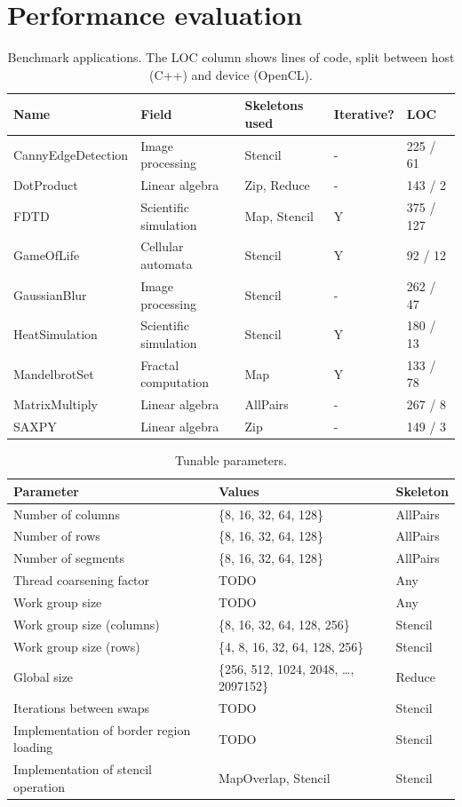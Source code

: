 \newpage
\section*{Performance evaluation}

\begin{table}
\footnotesize
\centering
\begin{tabular}{| l | l | l | l | l |}
\hline
\textbf{Name} & \textbf{Field} & \textbf{Skeletons used} & \textbf{Iterative?} & \textbf{LOC}\\
\hline
CannyEdgeDetection & Image processing & Stencil & - & 225 / 61\\
DotProduct & Linear algebra & Zip, Reduce & - & 143 / 2\\
FDTD & Scientific simulation & Map, Stencil & Y & 375 / 127\\
GameOfLife & Cellular automata & Stencil & Y & 92 / 12\\
GaussianBlur & Image processing & Stencil & - & 262 / 47\\
HeatSimulation & Scientific simulation & Stencil & Y & 180 / 13\\
MandelbrotSet & Fractal computation & Map & Y & 133 / 78\\
MatrixMultiply & Linear algebra & AllPairs & - & 267 / 8\\
SAXPY & Linear algebra & Zip & - & 149 / 3\\
\hline
\end{tabular}
\caption{Benchmark applications. The LOC column shows lines of code, split between host (C++) and device (OpenCL).}
\end{table}


\begin{table}
\footnotesize
\centering
\begin{tabular}{| l | l | l |}
\hline
\textbf{Parameter} & \textbf{Values} & \textbf{Skeleton}\\
\hline
Number of columns & \{8, 16, 32, 64, 128\} & AllPairs\\
Number of rows & \{8, 16, 32, 64, 128\} & AllPairs\\
Number of segments & \{8, 16, 32, 64, 128\} & AllPairs\\
Thread coarsening factor & TODO & Any\\
Work group size & TODO & Any\\
Work group size (columns) & \{8, 16, 32, 64, 128, 256\} & Stencil\\
Work group size (rows) & \{4, 8, 16, 32, 64, 128, 256\} & Stencil\\
Global size & \{256, 512, 1024, 2048, \ldots, 2097152\} & Reduce\\
Iterations between swaps & TODO & Stencil\\
Implementation of border region loading & TODO & Stencil\\
Implementation of stencil operation & {MapOverlap, Stencil} & Stencil\\
\hline
\end{tabular}
\caption{Tunable parameters.}
\end{table}

